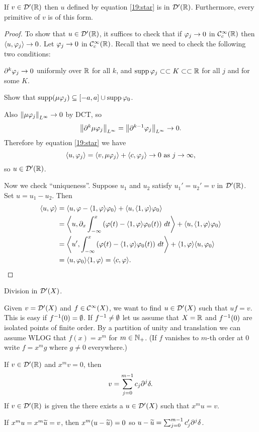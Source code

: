 \begin{thm}
  If $v\in\mathcal{D}'(\mathbb{R})$ then $u$ defined by equation \ref{19:star} is in $\mathcal{D}'(\mathbb{R})$.
  Furthermore, every primitive of $v$ is of this form.
\end{thm}

\begin{proof}
  To show that $u\in\mathcal{D}'(\mathbb{R})$, it suffices to check that if $\varphi_j\to0$ in $\mathcal{C}_c^\infty(\mathbb{R})$ then ${\left\langle u,\varphi_j \right\rangle}\to0$.
  Let $\varphi_j\to0$ in $\mathcal{C}_c^\infty(\mathbb{R})$.
  Recall that we need to check the following two conditions:
  \begin{itm}
    \io $\partial^k\varphi_j\to0$ uniformly over $\mathbb{R}$ for all $k$, and
    \io $\operatorname{supp}\varphi_j\subset\subset K\subset\subset \mathbb{R}$ for all $j$ and for some $K$.
  \end{itm}
  \begin{exer}
    Show that $\operatorname{supp}(\mu\varphi_j)\subseteq[-a,a]\cup\operatorname{supp}\varphi_0$.
  \end{exer}
  Also $\left\lVert \mu\varphi_j \right\rVert_{L^\infty}\to0$ by DCT, so
  \[ \left\lVert \partial^k\mu\varphi_j \right\rVert_{L^\infty} = \left\lVert \partial^{k-1}\varphi_j \right\rVert_{L^\infty} \to 0. \]
  Therefore by equation \ref{19:star} we have
  \[ {\left\langle u,\varphi_j \right\rangle} = {\left\langle v,\mu\varphi_j \right\rangle} + {\left\langle c,\varphi_j \right\rangle} \to 0 \text{ as } j\to\infty, \]
  so $u\in\mathcal{D}'(\mathbb{R})$.

  Now we check ``uniqueness''.
  Suppose $u_1$ and $u_2$ satisfy $u_1'=u_2'=v$ in $\mathcal{D}'(\mathbb{R})$.
  Set $u=u_1-u_2$.
  Then
  \begin{align*}
    {\left\langle u,\varphi\right\rangle} &= {\left\langle u,\varphi-{\left\langle 1,\varphi \right\rangle}\varphi_0 \right\rangle} + {\left\langle u,{\left\langle 1,\varphi \right\rangle}\varphi_0 \right\rangle} \\
    &= {\left\langle u, \partial_x \int_{-\infty}^x \left( \varphi(t)-{\left\langle 1,\varphi \right\rangle}\varphi_0(t) \right) \, dt \right\rangle} + {\left\langle u,{\left\langle 1,\varphi \right\rangle}\varphi_0 \right\rangle} \\
    &= {\left\langle u', \int_{-\infty}^x \left( \varphi(t)-{\left\langle 1,\varphi \right\rangle}\varphi_0(t) \right) \, dt \right\rangle} + {\left\langle 1,\varphi \right\rangle}{\left\langle u,\varphi_0 \right\rangle} \\
    &= {\left\langle u,\varphi_0 \right\rangle}{\left\langle 1,\varphi \right\rangle} = {\left\langle c,\varphi \right\rangle}.
  \end{align*}
\end{proof}

Division in $\mathcal{D}'(X)$.

Given $v=\mathcal{D}'(X)$ and $f\in\mathcal{C}^\infty(X)$, we want to find $u\in\mathcal{D}'(X)$ such that $uf=v$.
This is easy if $f^{-1}(0)=\emptyset$.
If $f^{-1}\neq\emptyset$ let us assume that $X=\mathbb{R}$ and $f^{-1}(0)$ are isolated points of finite order.
By a partition of unity and translation we can assume WLOG that $f(x)=x^m$ for $m\in\mathbb{N}_+$.
(If $f$ vanishes to $m$-th order at $0$ write $f=x^mg$ where $g\neq0$ everywhere.)

\begin{thm}
  \lv
  \begin{enum}
    \io If $v\in\mathcal{D}'(\mathbb{R})$ and $x^mv=0$, then
    \[ v = \sum_{j=0}^{m-1} c_j\partial^j\delta. \]
    \io If $v\in\mathcal{D}'(\mathbb{R})$ is given the there exists a $u\in\mathcal{D}'(X)$ such that $x^mu=v$.
  \end{enum}
\end{thm}

\begin{rmk}
  If $x^mu=x^m\widetilde u=v$, then $x^m(u-\widetilde u)=0$ so $u-\widetilde u=\sum_{j=0}^{m-1}c'_j\partial^j\delta$.
\end{rmk}
